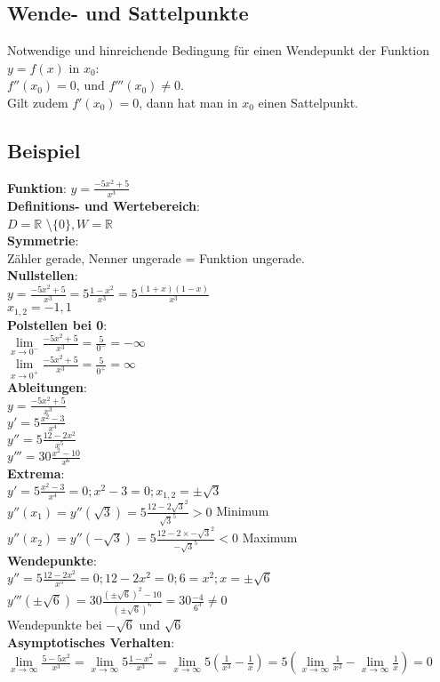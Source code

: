 \documentclass[../main.tex]{subfiles}
\begin{document}
\subsection{Wende- und Sattelpunkte}
Notwendige und hinreichende Bedingung für einen Wendepunkt der Funktion $y=f(x)$ in $x_0$: \\
$f''(x_0) = 0$, und $f'''(x_0) \neq 0$. \\
Gilt zudem $f'(x_0) = 0$, dann hat man in $x_0$ einen Sattelpunkt.

\subsection{Beispiel}
\textbf{Funktion}: $y = \frac{-5x^2 + 5}{x^3}$ \\ [7pt]
\textbf{Definitions- und Wertebereich}: \\
 $D = \mathbb{R}$ \textbackslash $\{0\}, W = \mathbb{R}$ \\ [7pt]
\textbf{Symmetrie}: \\
Zähler gerade, Nenner ungerade = Funktion ungerade. \\ [7pt]
\textbf{Nullstellen}: \\
$y = \frac{-5x^2 + 5}{x^3} = 5 \frac{1-x^2}{x^3} = 5 \frac{(1+x)(1-x)}{x^3}$ \\ [7pt]
$x_{1,2} = -1,1$ \\ [7pt]
\textbf{Polstellen bei 0}: \\
$\lim\limits_{x \to 0^-} \frac{-5x^2+5}{x^3} = \frac{5}{0^-} = -\infty$ \\ [7pt]
$\lim\limits_{x \to 0^+} \frac{-5x^2+5}{x^3} = \frac{5}{0^+} = \infty$ \\ [7pt]
\textbf{Ableitungen}: \\
$y = \frac{-5x^2 + 5}{x^3}$ \\ [7pt]
$y' = 5\frac{x^2-3}{x^4}$ \\ [7pt]
$y'' = 5\frac{12 - 2x^2}{x^5}$ \\ [7pt]
$y''' = 30 \frac{x^2 - 10}{x^6}$ \\ [7pt]
\textbf{Extrema}: \\
$y' = 5\frac{x^2-3}{x^4} = 0; x^2-3=0; x_{1,2}=\pm\sqrt{3}$ \\ [7pt]
$y''(x_1)=y''(\sqrt{3}) = 5 \frac{12 - 2\sqrt{3}^2}{\sqrt{3}^5} > 0$ Minimum \\ [7pt]
$y''(x_2)=y''(-\sqrt{3}) = 5 \frac{12 - 2 \times -\sqrt{3}^2}{-\sqrt{3}^5} < 0$ Maximum \\ [7pt]
\textbf{Wendepunkte}: \\
$y'' = 5\frac{12 - 2x^2}{x^5} = 0; 12-2x^2=0; 6=x^2; x=\pm \sqrt{6}$ \\ [7pt]
$y'''(\pm \sqrt{6}) = 30 \frac{(\pm \sqrt{6})^2 - 10}{(\pm \sqrt{6})^6}
= 30 \frac{-4}{6^3} \neq 0$ \\ [7pt]
Wendepunkte bei $-\sqrt{6}$ und $\sqrt{6}$ \\ [7pt]
\textbf{Asymptotisches Verhalten}: \\
$\lim\limits_{x \to \infty} \frac{5-5x^2}{x^3} = \lim\limits_{x \to \infty} 5\frac{1-x^2}{x^3} 
= \lim\limits_{x \to \infty} 5(\frac{1}{x^3} - \frac{1}{x}) 
= 5 (\lim\limits_{x \to \infty} \frac{1}{x^3} - \lim\limits_{x \to \infty} \frac{1}{x}) = 0$
\end{document}
